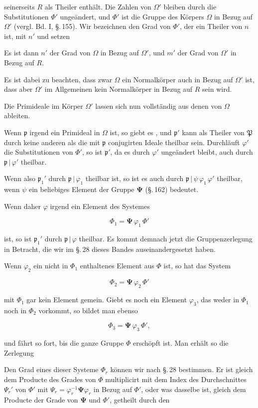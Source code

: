 seinerseits $R$ als Theiler enthält. Die Zahlen von $\Omega'$ bleiben
durch die Substitutionen $\Phi'$ ungeändert, und $\Phi'$ ist die Gruppe des
Körpers $\Omega$ in Bezug auf $\Omega'$ (vergl. Bd. I, \S.\,155). Wir bezeichnen
den Grad von $\Phi'$, der ein Theiler von $n$ ist, mit $n'$ und setzen


Es ist dann $n'$ der Grad von $\Omega$ in Bezug auf $\Omega'$, und $m'$
der Grad von $\Omega'$ in Bezug auf $R$.

Es ist dabei zu beachten, dass zwar $\Omega$ ein Normalkörper
auch in Bezug auf $\Omega'$ ist, dass aber $\Omega'$ im Allgemeinen kein
Normalkörper in Bezug auf $R$ sein wird.

Die Primideale im Körper $\Omega'$ lassen sich nun vollständig aus
denen von $\Omega$ ableiten.

Wenn $\mathfrak{p}$ irgend ein Primideal in $\Omega$ ist, so giebt es , und $\mathfrak{p}'$ kann als
Theiler von $\mathfrak{P}$ durch keine anderen als die mit $\mathfrak{p}$ conjugirten Ideale
theilbar sein. Durchläuft $\varphi'$ die Substitutionen von $\Phi'$, so ist $\mathfrak{p}'$,
da es durch $\varphi'$ ungeändert bleibt, auch durch $\mathfrak{p}\,|\,\varphi'$ theilbar.

Wenn also $\mathfrak{p}_1'$ durch $\mathfrak{p}\,|\,\varphi_1$ theilbar ist, so ist es auch durch
$\mathfrak{p}\,|\,\psi\,\varphi_1\,\varphi'$ theilbar, wenn $\psi$ ein beliebiges Element der Gruppe
$\boldsymbol{\Psi}$ (\S.\,162) bedeutet.

Wenn daher $\varphi$ irgend ein Element des Systemes

\[
\Phi_1 = \boldsymbol{\Psi}\,\varphi_1\,\Phi'
\]

ist, so ist $\mathfrak{p}_1'$ durch $\mathfrak{p}\,|\,\varphi$ theilbar. Es kommt demnach jetzt die
Gruppenzerlegung in Betracht, die wir im \S.\,28 dieses Bandes
auseinandergesetzt haben.

Wenn $\varphi_2$ ein nicht in $\Phi_1$ enthaltenes Element aus $\Phi$ ist, so
hat das System

\[
\Phi_2 = \boldsymbol{\Psi}\,\varphi_2\,\Phi'
\]

mit $\Phi_1$ gar kein Element gemein. Giebt es noch ein Element $\varphi_3$,
das weder in $\Phi_1$ noch in $\Phi_2$ vorkommt, so bildet man ebenso

\[
\Phi_3 = \boldsymbol{\Psi}\,\varphi_3\,\Phi',
\]

und fährt so fort, bis die ganze Gruppe $\Phi$ erschöpft ist. Man
erhält so die Zerlegung


Den Grad eines dieser Systeme $\Phi_r$ können wir nach \S.\,28 bestimmen.
Er ist gleich dem Producte des Grades von $\Phi$ multiplicirt mit %
dem Index des Durchschnittes $\Psi_r'$ von $\Phi'$ mit $\Psi_r = \varphi_r^{-1}\boldsymbol{\Psi}\varphi_r$ in
Bezug auf $\Phi'$, oder was dasselbe ist, gleich dem Producte der
Grade von $\boldsymbol{\Psi}$ und $\Phi'$, getheilt durch den
